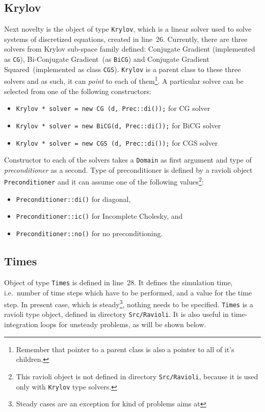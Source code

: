 \subsection{Krylov}

Next novelty is the object of type {\tt Krylov}, which is a linear solver
used to solve systems of discretized equations, created in line~26. Currently,
there are three solvers from Krylov sub-space family defined: Conjugate Gradient
(implemented as {\tt CG}), Bi-Conjugate Gradient~(as {\tt BiCG}) and Conjugate 
Gradient Squared~(implemented as class {\tt CGS}). 
{\tt Krylov} is a parent class to these three 
solvers and as such, it can {\em point} to each of them\footnote{Remember that
pointer to a parent class is also a pointer to all of it's children.}. A 
particular solver can be selected from one of the following constructors:

\begin{itemize}
  \item {\tt Krylov * solver = new CG  (d, Prec::di());} for CG   solver
  \item {\tt Krylov * solver = new BiCG(d, Prec::di());} for BiCG solver
  \item {\tt Krylov * solver = new CGS (d, Prec::di());} for CGS  solver
\end{itemize}

Constructor to each of the solvers takes a {\tt Domain} as first argument
and type of {\em preconditioner} as a second. Type of preconditioner is
defined by a ravioli object {\tt Preconditioner} and it can assume one of
the following values\footnote{This ravioli object is not defined in directory
{\tt Src/Ravioli}, because it is used only with {\tt Krylov} type solvers.}:
%
\begin{itemize}
  \item {\tt Preconditioner::di()} for diagonal,  
  \item {\tt Preconditioner::ic()} for Incomplete Cholesky, and  
  \item {\tt Preconditioner::no()} for no preconditioning.           
\end{itemize}

\subsection{Times}

Object of type {\tt Times} is defined in line~28. It defines the simulation
time, i.e.\ number of time steps which have to be performed, and a value
for the time step. In present case, which is steady\footnote{Steady cases are
an exception for kind of problems {\psiboil} aims at}, nothing needs to
be specified. 
{\tt Times} is a ravioli type object, defined in directory {\tt Src/Ravioli}. 
It is also useful in time-integration loops for unsteady problems, as will 
be shown below. 

